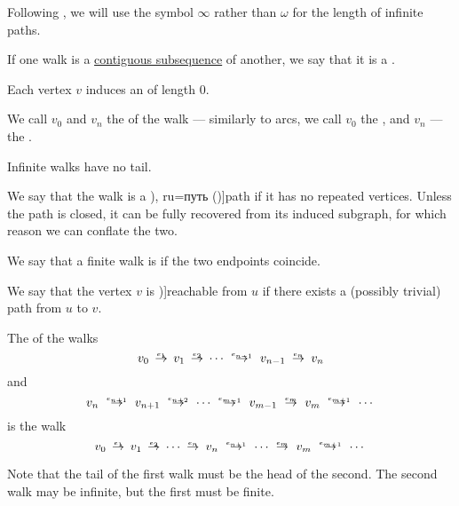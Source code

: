 \begin{definition}
\begin{thmenum}[resume=def:graph_walk]
    Following , we will use the symbol \( \infty \) rather than \( \omega \) for the length of infinite paths.

     If one walk is a \hyperref[def:contiguous_subsequence]{contiguous subsequence} of another, we say that it is a .

     Each vertex \( v \) induces an  of length \( 0 \).

     We call \( v_0 \) and \( v_n \) the  of the walk --- similarly to arcs, we call \( v_0 \) the , and \( v_n \) --- the .

    Infinite walks have no tail.

     We say that the walk is a \term[bg=път (\cite[11]{Мирчев2001Графи}), ru=путь (\cite[278]{БелоусовТкачёв2004ДискретнаяМатематика})]{path} if it has no repeated vertices. Unless the path is closed, it can be fully recovered from its induced subgraph, for which reason we can conflate the two.

     We say that a finite walk is  if the two endpoints coincide.

     We say that the vertex \( v \) is \term[ru=достижимая (вершина) (\cite[278]{БелоусовТкачёв2004ДискретнаяМатематика})]{reachable} from \( u \) if there exists a (possibly trivial) path from \( u \) to \( v \).

     The  of the walks
    \begin{equation*}
      v_0 \reloset {e_1} \to v_1 \reloset {e_2} \to \cdots \reloset {e_{n-1}} \to v_{n-1} \reloset {e_n} \to v_n
    \end{equation*}
    and
    \begin{equation*}
      v_n \reloset {e_{n+1}} \to v_{n+1} \reloset {e_{n+2}} \to \cdots \reloset {e_{m-1}} \to v_{m-1} \reloset {e_m} \to v_m \reloset {e_{m+1}} \to \cdots
    \end{equation*}
    is the walk
    \begin{equation*}
      v_0 \reloset {e_1} \to v_1 \reloset {e_2} \to \cdots \reloset {e_n} \to v_n \reloset {e_{n+1}} \to \cdots \reloset {e_m} \to v_m  \reloset {e_{m+1}} \to \cdots
    \end{equation*}

    Note that the tail of the first walk must be the head of the second. The second walk may be infinite, but the first must be finite.
  \end{thmenum}
\end{definition}
